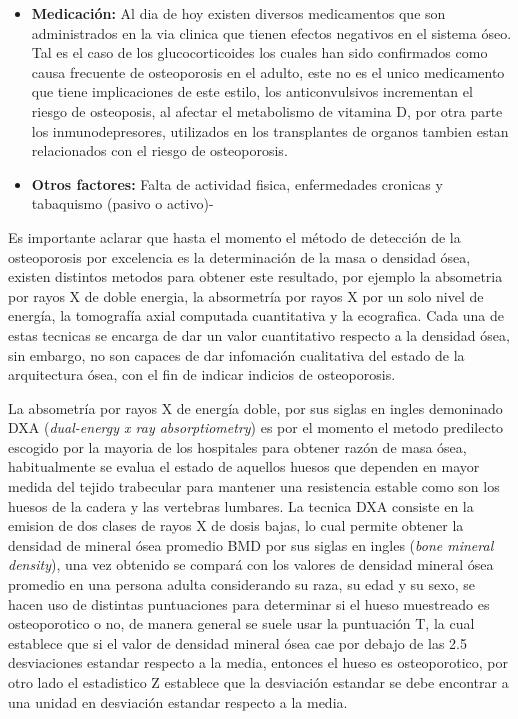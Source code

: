 \documentclass[letterpaper,12pt,oneside]{book}
\begin{document}
\begin{itemize}
        \item \textbf{Medicación:} Al dia de hoy existen diversos medicamentos que son administrados en la via clinica que tienen efectos negativos en el sistema óseo. Tal es el caso de los glucocorticoides los cuales han sido confirmados como causa frecuente de osteoporosis en el adulto, este no es el unico medicamento que tiene implicaciones de este estilo, los anticonvulsivos incrementan el riesgo de osteoposis, al afectar el metabolismo de vitamina D, por otra parte los inmunodepresores, utilizados en los transplantes de organos tambien estan relacionados con el riesgo de osteoporosis.
        \item \textbf{Otros factores:} Falta de actividad fisica, enfermedades cronicas y tabaquismo (pasivo o activo)- 
    \end{itemize}

    \vspace{10pt}

    Es importante aclarar que hasta el momento el método de detección de la osteoporosis por excelencia es la determinación de la masa o densidad ósea, existen distintos metodos para obtener este resultado, por ejemplo la absometria por rayos X de doble energia, la absormetría por rayos X por un solo nivel de energía, la tomografía axial computada cuantitativa y la ecografica. Cada una de estas tecnicas se encarga de dar un valor cuantitativo respecto a la densidad ósea, sin embargo, no son capaces de dar infomación cualitativa del estado de la arquitectura ósea, con el fin de indicar indicios de osteoporosis.

    \vspace{10pt}

    La absometría por rayos X de energía doble, por sus siglas en ingles demoninado DXA (\textit{dual-energy x ray absorptiometry}) es por el momento el metodo predilecto escogido por la mayoria de los hospitales para obtener razón de masa ósea, habitualmente se evalua el estado de aquellos huesos que dependen en mayor medida del tejido trabecular para mantener una resistencia estable como son los huesos de la cadera y las vertebras lumbares. La tecnica DXA consiste en la emision de dos clases de rayos X de dosis bajas, lo cual permite obtener la densidad de mineral ósea promedio BMD por sus siglas en ingles (\textit{bone mineral density}), una vez obtenido se compará con los valores de densidad mineral ósea promedio en una persona adulta considerando su raza, su edad y su sexo, se hacen uso de distintas puntuaciones para determinar si el hueso muestreado es osteoporotico o no, de manera general se suele usar la puntuación T, la cual establece que si el valor de densidad mineral ósea cae por debajo de las 2.5 desviaciones estandar respecto a la media, entonces el hueso es osteoporotico, por otro lado el estadistico Z establece que la desviación estandar se debe encontrar a una unidad en desviación estandar respecto a la media.
\end{document}
